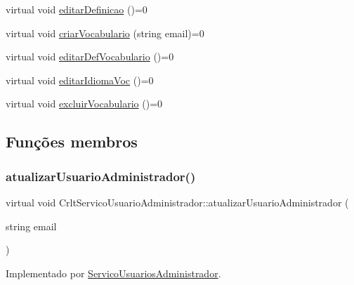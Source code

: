 \begin{DoxyCompactItemize}
\item 
virtual void \mbox{\hyperlink{class_crlt_servico_usuario_administrador_a7b709ffa7b27a96970c71997d75b1032}{editar\+Definicao}} ()=0
\item 
virtual void \mbox{\hyperlink{class_crlt_servico_usuario_administrador_a69862854fcbb5cdc3708f39a6aeeea83}{criar\+Vocabulario}} (string email)=0
\item 
virtual void \mbox{\hyperlink{class_crlt_servico_usuario_administrador_aa4ace57c1fe84fc38302133426a2cfd8}{editar\+Def\+Vocabulario}} ()=0
\item 
virtual void \mbox{\hyperlink{class_crlt_servico_usuario_administrador_adf459478defbc327815266343866a1ab}{editar\+Idioma\+Voc}} ()=0
\item 
virtual void \mbox{\hyperlink{class_crlt_servico_usuario_administrador_a55d722de48eb016aef0d7290cb36e51d}{excluir\+Vocabulario}} ()=0
\end{DoxyCompactItemize}


\subsection{Funções membros}
\mbox{\label{class_crlt_servico_usuario_administrador_ab0492870331c189997ea174f0482202e}} 
\subsubsection{\texorpdfstring{atualizar\+Usuario\+Administrador()}{atualizarUsuarioAdministrador()}}
{\footnotesize\ttfamily virtual void Crlt\+Servico\+Usuario\+Administrador\+::atualizar\+Usuario\+Administrador (\begin{DoxyParamCaption}\item[{string}]{email }\end{DoxyParamCaption})\hspace{0.3cm}{\ttfamily [pure virtual]}}



Implementado por \mbox{\hyperlink{class_servico_usuarios_administrador_a1111b56d40dff5aa7186c4f3dfe2e598}{Servico\+Usuarios\+Administrador}}.

